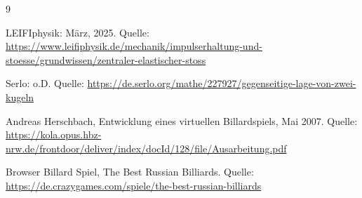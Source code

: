 \documentclass[a4paper,12pt]{article}
\begin{document}
	
	\newpage
	\begin{thebibliography}{9}
		
		
		LEIFIphysik: März, 2025. Quelle: \url{https://www.leifiphysik.de/mechanik/impulserhaltung-und-stoesse/grundwissen/zentraler-elastischer-stoss}
		
		
		Serlo: o.D. Quelle: \url{https://de.serlo.org/mathe/227927/gegenseitige-lage-von-zwei-kugeln}
		
		
		Andreas Herschbach, Entwicklung eines virtuellen Billardspiels, Mai 2007.  
		Quelle: \url{https://kola.opus.hbz-nrw.de/frontdoor/deliver/index/docId/128/file/Ausarbeitung.pdf}  
		
		
		Browser Billard Spiel, The Best Russian Billiards.  
		Quelle: \url{https://de.crazygames.com/spiele/the-best-russian-billiards} 
		
	\end{thebibliography}
	
	
	
\end{document}
